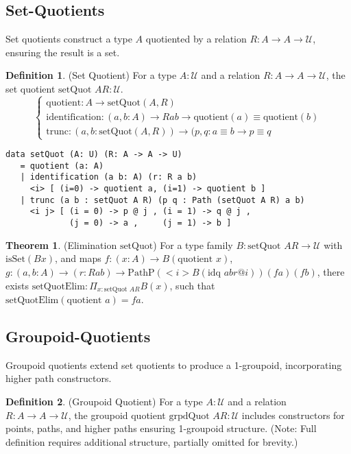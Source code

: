 \documentclass{article}
\theoremstyle{definition}
\newtheorem{theorem}{Theorem}
\newtheorem{definition}{Definition}
\begin{document}
\newpage

\subsection{Set-Quotients}
Set quotients construct a type $A$ quotiented by a
relation $R : A \to A \to \mathcal{U}$, ensuring the result is a set.

\begin{definition} (Set Quotient)
For a type $A : \mathcal{U}$ and a relation $R : A \to A \to \mathcal{U}$,
the set quotient $\text{setQuot } A R : \mathcal{U}$.
\[
\begin{cases}
\text{quotient} : A \to \text{setQuot}(A,R) \\
\text{identification} : (a, b : A) \to R a b \to \text{quotient}(a) \equiv \text{quotient}(b) \\
\text{trunc} : (a, b : \text{setQuot}(A,R)) \to (p, q : a \equiv b \to p \equiv q
\end{cases}
\]
\begin{lstlisting}
data setQuot (A: U) (R: A -> A -> U)
   = quotient (a: A)
   | identification (a b: A) (r: R a b)
     <i> [ (i=0) -> quotient a, (i=1) -> quotient b ]
   | trunc (a b : setQuot A R) (p q : Path (setQuot A R) a b)
     <i j> [ (i = 0) -> p @ j , (i = 1) -> q @ j ,
             (j = 0) -> a ,     (j = 1) -> b ]
\end{lstlisting}
\end{definition}

\begin{theorem} (Elimination $\text{setQuot}$)
For a type family $B : \text{setQuot } A R \to \mathcal{U}$ with $\text{isSet}(B x)$,
and maps $f : (x : A) \to B(\text{quotient } x)$,
$g : (a, b : A) \to (r : R a b) \to \text{PathP} (<i> B(\text{idq } a b r @ i)) (f a) (f b)$,
there exists $\text{setQuotElim} : \Pi_{x:\text{setQuot } A R} B(x)$, such that $\text{setQuotElim}(\text{quotient } a) = f a$.
\end{theorem}

\subsection{Groupoid-Quotients}
Groupoid quotients extend set quotients to produce a 1-groupoid,
incorporating higher path constructors.

\begin{definition} (Groupoid Quotient)
For a type $A : \mathcal{U}$ and a relation $R : A \to A \to \mathcal{U}$, the groupoid quotient $\text{grpdQuot } A R : \mathcal{U}$ includes constructors for points, paths, and higher paths ensuring 1-groupoid structure. (Note: Full definition requires additional structure, partially omitted for brevity.)
\end{definition}
\end{document}

